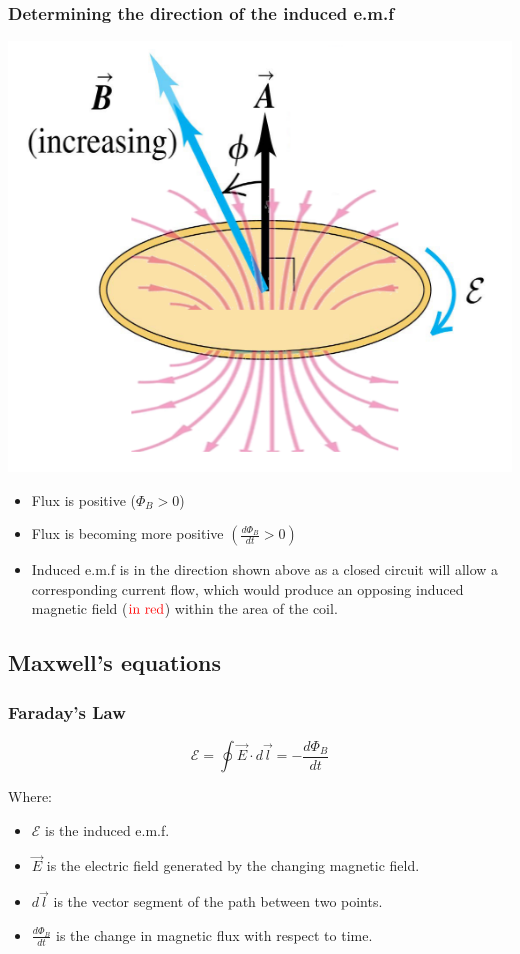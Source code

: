 \documentclass[11pt]{article}
\begin{document}
\subsubsection{Determining the direction of the induced e.m.f}
\label{sec:org30525dc}
\begin{center}
\includegraphics[width=.9\linewidth]{./images/lenz-law.png}
\end{center}

\begin{itemize}
\item Flux is positive (\(\Phi_B > 0\))
\item Flux is becoming more positive \((\frac{d \Phi_B}{dt} > 0)\)
\item Induced e.m.f is in the direction shown above as a closed circuit will allow a corresponding current flow, which would produce an opposing induced magnetic field (\(\textcolor{red}{\text{in red}}\)) within the area of the coil.
\end{itemize}
\subsection{Maxwell's equations}
\label{sec:orgd9ff936}

\subsubsection{Faraday's Law}
\label{sec:orgac1763f}
\[\mathcal{E} = \oint \vec{E} \cdot d \vec{l} = - \frac{d \Phi_B}{dt}\]

Where:
\begin{itemize}
\item \(\mathcal{E}\) is the induced e.m.f.
\item \(\vec{E}\) is the electric field generated by the changing magnetic field.
\item \(d \vec{l}\) is the vector segment of the path between two points.
\item \(\frac{d \Phi_B}{dt}\) is the change in magnetic flux with respect to time.
\end{itemize}
\end{document}
